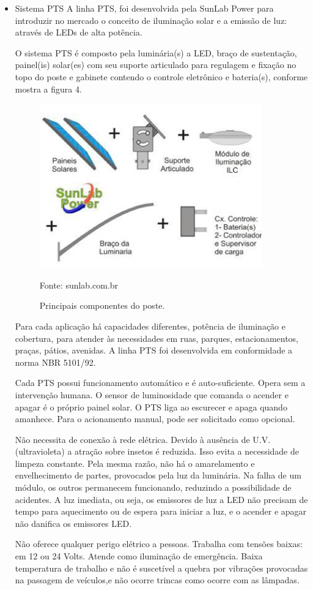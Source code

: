 \begin{itemize}
	\item Sistema PTS
	A linha PTS, foi desenvolvida pela SunLab Power para introduzir no mercado o conceito de iluminação solar e a emissão de luz: através de LEDs de alta potência. 
	
	O sistema PTS é composto pela luminária(s) a LED, braço de sustentação, painel(is) solar(es) com seu suporte articulado para regulagem e fixação no topo do poste e gabinete contendo o controle eletrônico e bateria(s), conforme mostra a figura 4.
	
	\begin{figure}[H]
	 \centering
	\label{Principais componentes do poste}
	 \includegraphics[keepaspectratio=true,scale=0.8]{postes/5.png}
	 \caption{Principais componentes do poste.}
	 \small{Fonte: sunlab.com.br}
	\end{figure}
	
	Para cada aplicação há capacidades diferentes, potência de iluminação e cobertura, para atender às necessidades em ruas, parques, estacionamentos, praças, pátios, avenidas. A linha PTS foi desenvolvida em conformidade a norma NBR 5101/92. 
	
	Cada PTS possui funcionamento automático e é auto-suficiente. Opera sem a intervenção humana. O sensor de luminosidade que comanda o acender e apagar é o próprio painel solar. O PTS liga ao escurecer e apaga quando amanhece. Para o acionamento manual, pode ser solicitado como opcional. 
 	
 	Não necessita de conexão à rede elétrica.  Devido à ausência de U.V. (ultravioleta) a atração sobre insetos é reduzida. Isso evita a necessidade de limpeza constante. Pela mesma razão, não há o amarelamento e envelhecimento de partes, provocados pela luz da luminária.  Na falha de um módulo, os outros permanecem funcionando, reduzindo a possibilidade de acidentes.  A luz imediata, ou seja, os emissores de luz a LED não precisam de tempo para aquecimento ou de espera para iniciar a luz, e  o acender e apagar não danifica os emissores LED.
	
	Não oferece qualquer perigo elétrico a pessoas. Trabalha com tensões baixas: em 12 ou 24 Volts. Atende como iluminação de emergência.  Baixa temperatura de trabalho e não é suscetível a quebra por vibrações provocadas na passagem de veículos,e não ocorre trincas como ocorre com as lâmpadas. 	
\end{itemize}

